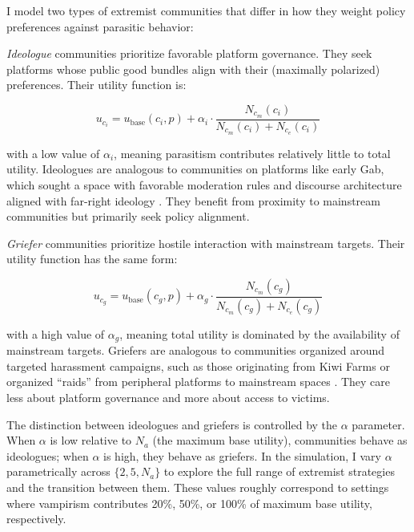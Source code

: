 \documentclass{article}
\begin{document}
I model two types of extremist communities that differ in how they weight policy preferences against parasitic behavior:

\textit{Ideologue} communities prioritize favorable platform governance. They seek platforms whose public good bundles align with their (maximally polarized) preferences. Their utility function is:

\begin{equation}
u_{c_i} = u_{\text{base}}(c_i, p) + \alpha_i \cdot \frac{N_{c_m}(c_i)}{N_{c_m}(c_i) + N_{c_e}(c_i)}
\label{eq:ideologue}
\end{equation}

\noindent with a low value of $\alpha_i$, meaning parasitism contributes relatively little to total utility. Ideologues are analogous to communities on platforms like early Gab, which sought a space with favorable moderation rules and discourse architecture aligned with far-right ideology \citep{jasserWelcomeGabFamFarright2023}. They benefit from proximity to mainstream communities but primarily seek policy alignment.

\textit{Griefer} communities prioritize hostile interaction with mainstream targets. Their utility function has the same form:

\begin{equation}
u_{c_g} = u_{\text{base}}(c_g, p) + \alpha_g \cdot \frac{N_{c_m}(c_g)}{N_{c_m}(c_g) + N_{c_e}(c_g)}
\label{eq:griefer_app}
\end{equation}

\noindent with a high value of $\alpha_g$, meaning total utility is dominated by the availability of mainstream targets. Griefers are analogous to communities organized around targeted harassment campaigns, such as those originating from Kiwi Farms or organized ``raids'' from peripheral platforms to mainstream spaces \citep{lavin2020culture, gais2021encrypted}. They care less about platform governance and more about access to victims.

The distinction between ideologues and griefers is controlled by the $\alpha$ parameter. When $\alpha$ is low relative to $N_a$ (the maximum base utility), communities behave as ideologues; when $\alpha$ is high, they behave as griefers. In the simulation, I vary $\alpha$ parametrically across $\{2, 5, N_a\}$ to explore the full range of extremist strategies and the transition between them. These values roughly correspond to settings where vampirism contributes 20\%, 50\%, or 100\% of maximum base utility, respectively.
\end{document}
